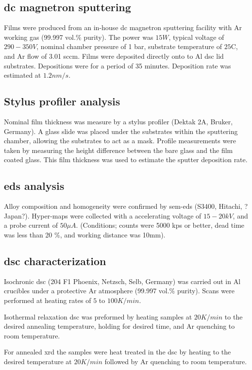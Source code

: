 \documentclass[a4paper,12pt,oneside]{article}%
\begin{document}
\subsection{\acrshort{dc} magnetron sputtering}
Films were produced from an in-house \acrshort{dc} magnetron sputtering facility with Ar working gas (99.997 vol.\% purity). The power was $15W$, typical voltage of $290-350V$, nominal chamber pressure of 1 bar, substrate temperature of $25$\degree C, and Ar flow of 3.01 \acrshort{sccm}. Films were deposited directly onto to Al \acrshort{dsc} lid substrates. Depositions were for a period of 35 minutes. Deposition rate was estimated at $1.2 nm/s$. 

\subsection{Stylus profiler analysis}
Nominal film thickness was measure by a stylus profiler (Dektak 2A, Bruker, Germany). A glass slide was placed under the substrates within the sputtering chamber, allowing the substrates to act as a mask. Profile measurements were taken by measuring the height difference between the bare glass and the film coated glass. This film thickness was used to estimate the sputter deposition rate.  

\subsection{\acrshort{eds} analysis}
Alloy composition and homogeneity were confirmed by \acrshort{sem}-\acrshort{eds} (S3400, Hitachi, ?Japan?). Hyper-maps were collected with a accelerating voltage of $15-20kV$, and a probe current of $50 \mu A$. (Conditions; counts were 5000 kps or better, dead time was less than 20 \%, and working distance was 10mm). 

\subsection{\acrshort{dsc} characterization}
Isochronic \acrshort{dsc} (204 F1 Phoenix, Netzsch, Selb, Germany) was carried out in Al crucibles under a protective Ar atmosphere (99.997 vol.\% purity). Scans were performed at heating rates of $5$ to $100 K/min$. 

Isothermal relaxation \acrshort{dsc} was preformed by heating samples at $20 K/min$ to the desired annealing temperature, holding for desired time, and Ar quenching to room temperature.

For annealed \acrshort{xrd} the samples were heat treated in the \acrshort{dsc} by heating to the desired temperature at $20 K/min$ followed by Ar quenching to room temperature.
\end{document}
